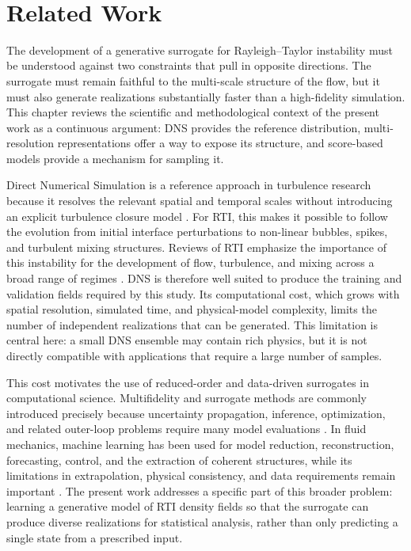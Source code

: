 
﻿\chapter{Related Work}
\label{chap:related-work}

The development of a generative surrogate for Rayleigh--Taylor instability must be understood against two constraints that pull in opposite directions. The surrogate must remain faithful to the multi-scale structure of the flow, but it must also generate realizations substantially faster than a high-fidelity simulation. This chapter reviews the scientific and methodological context of the present work as a continuous argument: DNS provides the reference distribution, multi-resolution representations offer a way to expose its structure, and score-based models provide a mechanism for sampling it.

Direct Numerical Simulation is a reference approach in turbulence research because it resolves the relevant spatial and temporal scales without introducing an explicit turbulence closure model \citep{MoinMahesh1998}. For RTI, this makes it possible to follow the evolution from initial interface perturbations to non-linear bubbles, spikes, and turbulent mixing structures. Reviews of RTI emphasize the importance of this instability for the development of flow, turbulence, and mixing across a broad range of regimes \citep{KULL1991197,zhou2017rti1}. DNS is therefore well suited to produce the training and validation fields required by this study. Its computational cost, which grows with spatial resolution, simulated time, and physical-model complexity, limits the number of independent realizations that can be generated. This limitation is central here: a small DNS ensemble may contain rich physics, but it is not directly compatible with applications that require a large number of samples.

This cost motivates the use of reduced-order and data-driven surrogates in computational science. Multifidelity and surrogate methods are commonly introduced precisely because uncertainty propagation, inference, optimization, and related outer-loop problems require many model evaluations \citep{Peherstorfer2018}. In fluid mechanics, machine learning has been used for model reduction, reconstruction, forecasting, control, and the extraction of coherent structures, while its limitations in extrapolation, physical consistency, and data requirements remain important \citep{Brunton2020MLFluid}. The present work addresses a specific part of this broader problem: learning a generative model of RTI density fields so that the surrogate can produce diverse realizations for statistical analysis, rather than only predicting a single state from a prescribed input.

